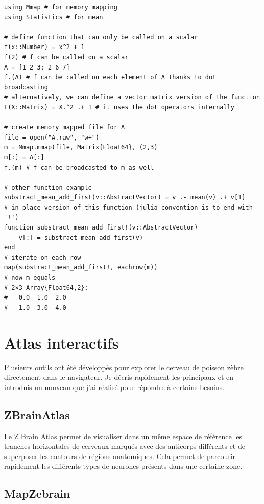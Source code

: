 \juliastyle
\begin{lstlisting}
using Mmap # for memory mapping
using Statistics # for mean

# define function that can only be called on a scalar
f(x::Number) = x^2 + 1
f(2) # f can be called on a scalar
A = [1 2 3; 2 6 7]
f.(A) # f can be called on each element of A thanks to dot broadcasting
# alternatively, we can define a vector matrix version of the function
F(X::Matrix) = X.^2 .+ 1 # it uses the dot operators internally

# create memory mapped file for A
file = open("A.raw", "w+")
m = Mmap.mmap(file, Matrix{Float64}, (2,3)
m[:] = A[:]
f.(m) # f can be broadcasted to m as well

# other function example
substract_mean_add_first(v::AbstractVector) = v .- mean(v) .+ v[1]
# in-place version of this function (julia convention is to end with '!')
function substract_mean_add_first!(v::AbstractVector)
	v[:] = substract_mean_add_first(v)
end
# iterate on each row
map(substract_mean_add_first!, eachrow(m))
# now m equals
# 2×3 Array{Float64,2}:
#   0.0  1.0  2.0
#  -1.0  3.0  4.0
\end{lstlisting}



\section{Atlas interactifs}

Plusieurs outils ont été développés pour explorer le cerveau de poisson zèbre directement dans le navigateur. Je décris rapidement les principaux et en introduis un nouveau que j'ai réalisé pour répondre à certains besoins.


\subsection{ZBrainAtlas}

Le \href{https://engertlab.fas.harvard.edu/Z-Brain/home/}{Z Brain Atlas} permet de visualiser dans un même espace de référence les tranches horizontales de cerveaux marqués avec des anticorps différents et de superposer les contours de régions anatomiques. Cela permet de parcourir rapidement les différents types de neurones présents dans une certaine zone.

\subsection{MapZebrain}

